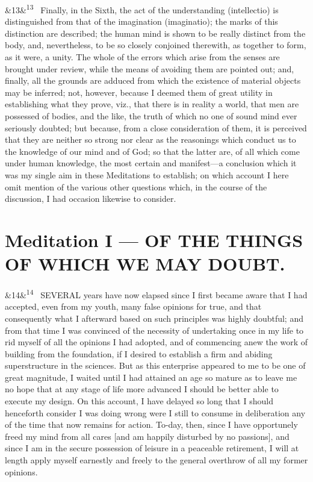 \documentclass[12pt]{article}
\newcommand{\para}[1][]{\par\noindent\ifx&#1&\else\textsuperscript{\footnotesize #1}~\fi}
\begin{document}
\para[13] Finally, in the Sixth, the act of the understanding (intellectio) is distinguished from that of the imagination (imaginatio); the marks of this distinction are described; the human mind is shown to be really distinct from the body, and, nevertheless, to be so closely conjoined therewith, as together to form, as it were, a unity. The whole of the errors which arise from the senses are brought under review, while the means of avoiding them are pointed out; and, finally, all the grounds are adduced from which the existence of material objects may be inferred; not, however, because I deemed them of great utility in establishing what they prove, viz., that there is in reality a world, that men are possessed of bodies, and the like, the truth of which no one of sound mind ever seriously doubted; but because, from a close consideration of them, it is perceived that they are neither so strong nor clear as the reasonings which conduct us to the knowledge of our mind and of God; so that the latter are, of all which come under human knowledge, the most certain and manifest---a conclusion which it was my single aim in these Meditations to establish; on which account I here omit mention of the various other questions which, in the course of the discussion, I had occasion likewise to consider.

\section*{Meditation I --- OF THE THINGS OF WHICH WE MAY DOUBT.}

\para[14] SEVERAL years have now elapsed since I first became aware that I had accepted, even from my youth, many false opinions for true, and that consequently what I afterward based on such principles was highly doubtful; and from that time I was convinced of the necessity of undertaking once in my life to rid myself of all the opinions I had adopted, and of commencing anew the work of building from the foundation, if I desired to establish a firm and abiding superstructure in the sciences. But as this enterprise appeared to me to be one of great magnitude, I waited until I had attained an age so mature as to leave me no hope that at any stage of life more advanced I should be better able to execute my design. On this account, I have delayed so long that I should henceforth consider I was doing wrong were I still to consume in deliberation any of the time that now remains for action. To-day, then, since I have opportunely freed my mind from all cares [and am happily disturbed by no passions], and since I am in the secure possession of leisure in a peaceable retirement, I will at length apply myself earnestly and freely to the general overthrow of all my former opinions.
\end{document}
